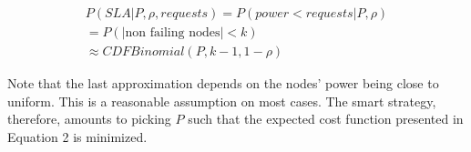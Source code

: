 \documentclass[12pt]{article}
\begin{document}
\begin{eqnarray*}
P(SLA | P, \rho, requests) = P(power < requests | P, \rho)\\
 = P(|\text{non failing nodes}| < k) \\ \approx CDF Binomial (P, k-1, 1 - \rho)
\end{eqnarray*}

Note that the last approximation depends on the nodes' power being close to
uniform. This is a reasonable assumption on most cases. The smart strategy,
therefore, amounts to picking $P$ such that the expected cost function presented
in Equation 2 is minimized.





\end{document}
